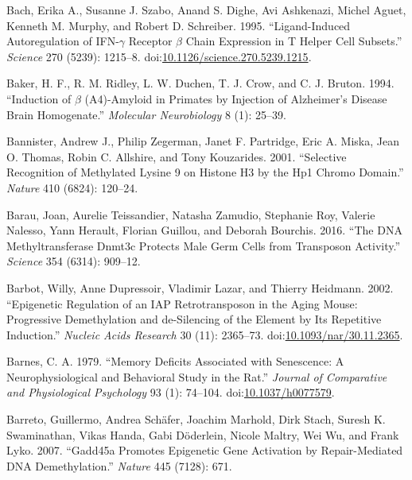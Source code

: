 \documentclass[onehalf,12pt]{beavtex}
\begin{document}
  \hypertarget{ref-BachLigandInducedAutoregulationIFNg1995}{}
  Bach, Erika A., Susanne J. Szabo, Anand S. Dighe, Avi Ashkenazi, Michel
  Aguet, Kenneth M. Murphy, and Robert D. Schreiber. 1995.
  ``Ligand-Induced Autoregulation of IFN-\(\gamma\) Receptor \(\beta\)
  Chain Expression in T Helper Cell Subsets.'' \emph{Science} 270 (5239):
  1215--8.
  doi:\href{https://doi.org/10.1126/science.270.5239.1215}{10.1126/science.270.5239.1215}.
  
  \hypertarget{ref-BakerInductionA4amyloid1994}{}
  Baker, H. F., R. M. Ridley, L. W. Duchen, T. J. Crow, and C. J. Bruton.
  1994. ``Induction of \(\beta\) (A4)-Amyloid in Primates by Injection of
  Alzheimer's Disease Brain Homogenate.'' \emph{Molecular Neurobiology} 8
  (1): 25--39.
  
  \hypertarget{ref-BannisterSelectiverecognitionmethylated2001}{}
  Bannister, Andrew J., Philip Zegerman, Janet F. Partridge, Eric A.
  Miska, Jean O. Thomas, Robin C. Allshire, and Tony Kouzarides. 2001.
  ``Selective Recognition of Methylated Lysine 9 on Histone H3 by the Hp1
  Chromo Domain.'' \emph{Nature} 410 (6824): 120--24.
  
  \hypertarget{ref-BarauDNAmethyltransferaseDNMT3C2016b}{}
  Barau, Joan, Aurelie Teissandier, Natasha Zamudio, Stephanie Roy,
  Valerie Nalesso, Yann Herault, Florian Guillou, and Deborah Bourchis.
  2016. ``The DNA Methyltransferase Dnmt3c Protects Male Germ Cells from
  Transposon Activity.'' \emph{Science} 354 (6314): 909--12.
  
  \hypertarget{ref-BarbotEpigeneticregulationIAP2002}{}
  Barbot, Willy, Anne Dupressoir, Vladimir Lazar, and Thierry Heidmann.
  2002. ``Epigenetic Regulation of an IAP Retrotransposon in the Aging
  Mouse: Progressive Demethylation and de-Silencing of the Element by Its
  Repetitive Induction.'' \emph{Nucleic Acids Research} 30 (11): 2365--73.
  doi:\href{https://doi.org/10.1093/nar/30.11.2365}{10.1093/nar/30.11.2365}.
  
  \hypertarget{ref-BarnesMemorydeficitsassociated1979}{}
  Barnes, C. A. 1979. ``Memory Deficits Associated with Senescence: A
  Neurophysiological and Behavioral Study in the Rat.'' \emph{Journal of
  Comparative and Physiological Psychology} 93 (1): 74--104.
  doi:\href{https://doi.org/10.1037/h0077579}{10.1037/h0077579}.
  
  \hypertarget{ref-BarretoGadd45apromotesepigenetic2007}{}
  Barreto, Guillermo, Andrea Schäfer, Joachim Marhold, Dirk Stach, Suresh
  K. Swaminathan, Vikas Handa, Gabi Döderlein, Nicole Maltry, Wei Wu, and
  Frank Lyko. 2007. ``Gadd45a Promotes Epigenetic Gene Activation by
  Repair-Mediated DNA Demethylation.'' \emph{Nature} 445 (7128): 671.
  
\end{document}
